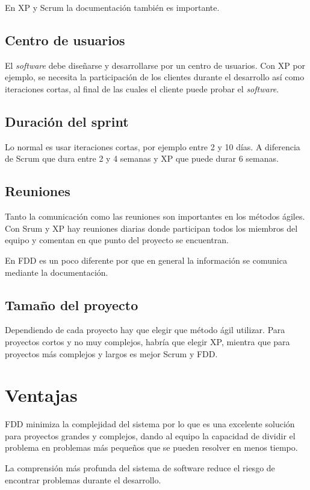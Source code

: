 \documentclass[11pt]{article}
\begin{document}
En XP y Scrum la documentación también es importante.

\subsection*{Centro de usuarios}

El \textit{software} debe diseñarse y desarrollarse por un centro de usuarios. Con XP por ejemplo, se necesita la participación de los clientes durante el desarrollo así como iteraciones cortas, al final de las cuales el cliente puede probar el \textit{software}.

\subsection*{Duración del sprint}
Lo normal es usar iteraciones cortas, por ejemplo entre 2 y 10 días. A diferencia de Scrum que dura entre 2 y 4 semanas y XP que puede durar 6 semanas.

\subsection*{Reuniones}
Tanto la comunicación como las reuniones son importantes en los métodos ágiles. Con Srum y XP hay reuniones diarias donde participan todos los miembros del equipo y comentan en que punto del proyecto se encuentran. 

En FDD es un poco diferente por que en general la información se comunica mediante la documentación.

\subsection*{Tamaño del proyecto}

Dependiendo de cada proyecto hay que elegir que método ágil utilizar. Para proyectos cortos y no muy complejos, habría que elegir XP, mientra que para proyectos más complejos y largos es mejor Scrum y FDD.


\section{Ventajas}
FDD minimiza la complejidad del sistema por lo que es una excelente solución para proyectos grandes y complejos, dando al equipo la capacidad de dividir el problema en problemas más pequeños que se pueden resolver en menos tiempo.

La comprensión más profunda del sistema de software reduce el riesgo de encontrar problemas durante el desarrollo.
\end{document}
